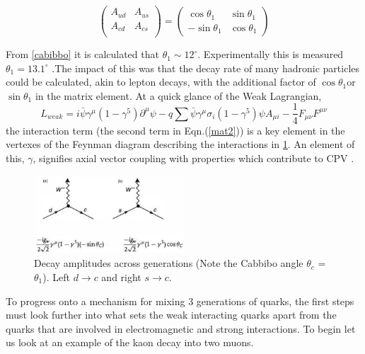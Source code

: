 \begin{equation}\label{mat1}
\left( \begin{array}{ccc} 
A_{ud} & A_{us} \\
A_{cd} & A_{cs}  \\
\end{array} \right)
 = \left( \begin{array}{ccc}
 \cos\theta_{1} & \sin\theta_{1} \\
 -\sin\theta_{1} & \cos\theta_{1} \end{array} \right)\end{equation}

From \cref{cabibbo} it is calculated that $\theta_1\sim 12^{\circ}$. Experimentally this is measured $\theta_1 = 13.1^{\circ}$ \cite{CKM9}.The impact of this was that the decay rate of many hadronic particles could be calculated, akin to lepton decays, with the additional factor of $\cos\theta_1$or $\sin\theta_1$ in the matrix element. At a quick glance of the Weak Lagrangian,
\begin{equation}\label{mat2}
L_{weak} = i\bar{\psi}\gamma^{\mu}(1-\gamma^{5})\partial^{\mu}\psi -q\sum\bar{\psi}\gamma^{\mu}\sigma_{i}(1-\gamma^{5})\psi A_{\mu i} -\frac{1}{4}F_{\mu \nu}F^{\mu \nu}
\end{equation} 
 the interaction term (the second term in Eqn.(\ref{mat2})) is a key element in the vertexes of the Feynman diagram describing the interactions in \cref{fey1}. An element of this, $\gamma$, signifies axial vector coupling with properties which contribute to CPV \cite{CKM2}.

\begin{figure}[h]
\centering
\includegraphics[width=0.5\textwidth]{figs/ckmfig2.jpg}
\caption{Decay amplitudes across generations (Note the Cabbibo angle $\theta_c$ =$\theta_1$). Left $d\rightarrow c$ and right $s\rightarrow c$.}
\label{fey1}
\end{figure}


To progress onto a mechanism for mixing 3 generations of quarks, the first steps must look further into what sets the weak interacting quarks apart from the quarks that are involved in electromagnetic and strong interactions. To begin let us look at an example of the kaon decay into two muons.

